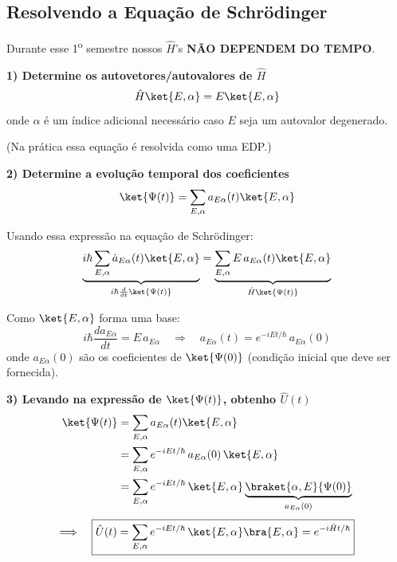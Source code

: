\subsection*{Resolvendo a Equação de Schrödinger}

Durante esse 1\textsuperscript{o} semestre nossos $\hat{H}$'s \textbf{NÃO DEPENDEM DO TEMPO}.

\textbf{1) Determine os autovetores/autovalores de $\hat{H}$}
\begin{equation}
    \hat{H}\ket{E,\alpha} = E\ket{E,\alpha}
\label{eq:aula13_autovetores_H}
\end{equation}
onde $\alpha$ é um índice adicional necessário caso $E$ seja um autovalor degenerado.

(Na prática essa equação é resolvida como uma EDP.)

\textbf{2) Determine a evolução temporal dos coeficientes}
\begin{equation}
    \ket{\Psi(t)} = \sum_{E,\alpha} a_{E\alpha}(t) \ket{E,\alpha}
\label{eq:aula13_expansao_psi}
\end{equation}

Usando essa expressão na equação de Schrödinger:
\begin{equation}
    \underbrace{i\hbar \sum_{E,\alpha} \dot{a}_{E\alpha}(t)\ket{E,\alpha}}_{i\hbar \frac{d}{dt}\ket{\Psi(t)}} = \underbrace{\sum_{E,\alpha} E\,a_{E\alpha}(t)\ket{E,\alpha}}_{\hat{H}\ket{\Psi(t)}}
\label{eq:aula13_ES_expandida}
\end{equation}

Como $\ket{E,\alpha}$ forma uma base:
\begin{equation}
    i\hbar \frac{da_{E\alpha}}{dt} = E\,a_{E\alpha} \quad \Longrightarrow \quad \boxed{a_{E\alpha}(t) = e^{-iEt/\hbar}\,a_{E\alpha}(0)}
\label{eq:aula13_aEalpha_t}
\end{equation}
onde $a_{E\alpha}(0)$ são os coeficientes de $\ket{\Psi(0)}$ (condição inicial que deve ser fornecida).

\textbf{3) Levando na expressão de $\ket{\Psi(t)}$, obtenho $\hat{U}(t)$}
\begin{align}
    \ket{\Psi(t)} &= \sum_{E,\alpha} a_{E\alpha}(t)\ket{E,\alpha} \notag \\
    &= \sum_{E,\alpha} e^{-iEt/\hbar}\, a_{E\alpha}(0)\,\ket{E,\alpha} \notag \\
    &= \sum_{E,\alpha} e^{-iEt/\hbar}\,\ket{E,\alpha}\underbrace{\braket{\alpha,E}{\Psi(0)}}_{a_{E\alpha}(0)}
\label{eq:aula13_psi_t_expandido}
\end{align}
\begin{equation}
    \Longrightarrow \quad \boxed{\hat{U}(t) = \sum_{E,\alpha} e^{-iEt/\hbar}\,\ket{E,\alpha}\bra{E,\alpha} = e^{-i\hat{H}t/\hbar}}
\label{eq:aula13_U_t_final}
\end{equation}

